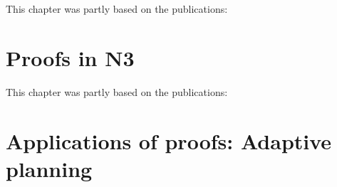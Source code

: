 \documentclass[11pt,a4paper,twoside]{book}
\begin{document}
\newpage
This chapter was partly based on the publications:
\vspace{0.3cm}


\vspace{0.3cm}


\vspace{0.3cm}


\vspace{0.3cm}


\chapter{Proofs in N3}\label{proof}


\clearpage
\newpage
This chapter was partly based on the publications:
\vspace{0.3cm}


\vspace{0.3cm}


\chapter{Applications of proofs: Adaptive planning}\label{restdesc}
%
%


\end{document}

